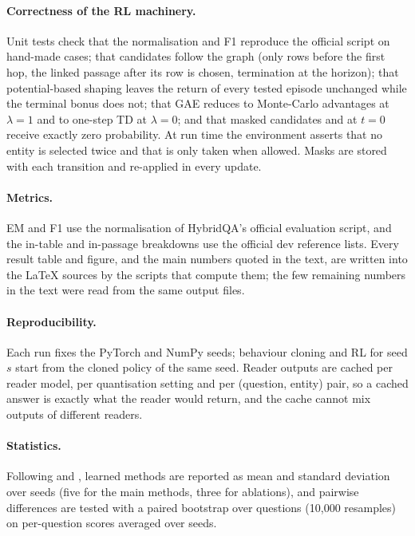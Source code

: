 \paragraph{Correctness of the RL machinery.} Unit tests check that the normalisation and F1 reproduce the official script on hand-made cases; that candidates follow the graph (only rows before the first hop, the linked passage after its row is chosen, termination at the horizon); that potential-based shaping leaves the return of every tested episode unchanged while the terminal bonus does not; that GAE reduces to Monte-Carlo advantages at $\lambda=1$ and to one-step TD at $\lambda=0$; and that masked candidates and \STOP{} at $t=0$ receive exactly zero probability. At run time the environment asserts that no entity is selected twice and that \STOP{} is only taken when allowed. Masks are stored with each transition and re-applied in every update.

\paragraph{Metrics.} EM and F1 use the normalisation of HybridQA's official evaluation script, and the in-table and in-passage breakdowns use the official dev reference lists. Every result table and figure, and the main numbers quoted in the text, are written into the \LaTeX{} sources by the scripts that compute them; the few remaining numbers in the text were read from the same output files.

\paragraph{Reproducibility.} Each run fixes the PyTorch and NumPy seeds; behaviour cloning and RL for seed $s$ start from the cloned policy of the same seed. Reader outputs are cached per reader model, per quantisation setting and per (question, entity) pair, so a cached answer is exactly what the reader would return, and the cache cannot mix outputs of different readers.

\paragraph{Statistics.} Following \citet{agarwal2021deep} and \citet{henderson2018deep}, learned methods are reported as mean and standard deviation over seeds (five for the main methods, three for ablations), and pairwise differences are tested with a paired bootstrap over questions (10{,}000 resamples) on per-question scores averaged over seeds.

